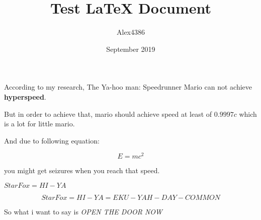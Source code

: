 \documentclass[12pt, letterpaper]{article}
\title{Test LaTeX Document}
\author{Alex4386}
\date{September 2019}
\begin{document}
\maketitle

According to my research, The Ya-hoo man: Speedrunner Mario can not achieve \textbf{hyperspeed}.

But in order to achieve that, mario should achieve speed at least of $0.9997c$ which is a lot for little mario.

And due to following equation:

\[ E = mc^2 \]

you might get seizures when you reach that speed.

\begin{math}
StarFox = HI-YA
\end{math}

\begin{equation}
    StarFox = HI-YA = EKU-YAH-DAY-COMMON
\end{equation}

So what i want to say is \emph{OPEN THE DOOR NOW}
\end{document}
